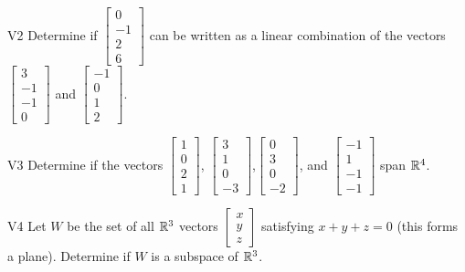 \documentclass{sbgLAexam}
\begin{document}
\begin{problem}{V2}
Determine if $\begin{bmatrix}0 \\ -1 \\ 2 \\ 6 \end{bmatrix}$ can be written as a linear combination of the vectors $\begin{bmatrix} 3 \\ -1 \\ -1 \\ 0 \end{bmatrix}$ and $\begin{bmatrix} -1 \\ 0 \\ 1 \\ 2 \end{bmatrix}$.
\end{problem}
\newpage

\begin{problem}{V3}
Determine if the vectors $\begin{bmatrix} 1 \\ 0 \\ 2 \\1 \end{bmatrix}$, $\begin{bmatrix} 3 \\ 1 \\ 0 \\ -3 \end{bmatrix}$,$\begin{bmatrix} 0 \\ 3 \\ 0 \\ -2 \end{bmatrix}$, and $\begin{bmatrix}-1 \\ 1 \\ -1 \\ -1 \end{bmatrix}$ span $\mathbb{R}^4$.
\end{problem}

\begin{problem}{V4} Let \(W\) be the set of all \(\mathbb{R}^3\) vectors
\(\begin{bmatrix} x \\ y \\ z \end{bmatrix}\) satisfying \(x+y+z=0\) (this forms a plane).
Determine if \(W\) is a subspace of \(\mathbb{R}^3\).
\end{problem}
\newpage
\end{document}
